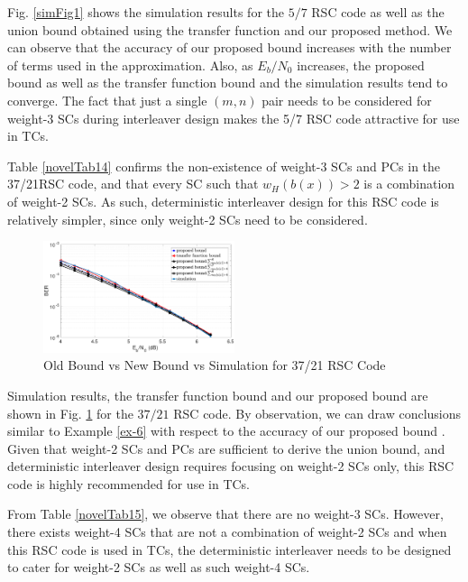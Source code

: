 Fig. \ref{simFig1} shows the simulation results for the $5/7$ RSC code as well as the union bound obtained using the transfer function and our proposed method. We can observe that the accuracy of our proposed bound increases with the number of terms used in the approximation. Also, as $E_b/N_0$ increases, the proposed bound as well as the transfer function bound and the simulation results tend to converge. The fact that just a single $(m,n)$ pair needs to be considered for weight-3 SCs during interleaver design makes the 5/7 RSC code attractive for use in TCs.
\label{ex-6}


Table \ref{novelTab14} confirms the non-existence of weight-3 SCs and PCs in the 37/21RSC code, and that every SC such that $w_H(b(x)) > 2$ is a combination of weight-2 SCs. As such, deterministic interleaver design for this RSC code is relatively simpler, since only weight-2 SCs need to be considered.
\begin{figure}[htbp]
	\centering
	\includegraphics[width=0.5\textwidth]{./Images/RSC_37_21_lower_weights2.eps}
	\caption{Old Bound vs New Bound vs Simulation for 37/21 RSC Code}
	\label{simFig2}
\end{figure}

Simulation results, the transfer function bound and our proposed bound are shown in Fig. \ref{simFig2} for the $37/21$ RSC code. By observation, we can draw conclusions similar to  Example \ref{ex-6} with respect to the accuracy of our proposed bound . Given that weight-2 SCs and PCs are sufficient to derive the union bound, and deterministic interleaver design requires focusing on weight-2 SCs only, this RSC code is highly recommended for use in TCs.

From Table \ref{novelTab15}, we observe that there are no weight-3 SCs. However, there exists weight-4 SCs that are not a combination of weight-2 SCs and when this RSC code is used in TCs, the deterministic interleaver needs to be designed to cater for weight-2 SCs as well as such weight-4 SCs. 
 
